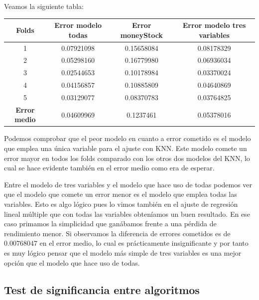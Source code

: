 \documentclass[12pt,a4paper]{article}
\begin{document}
Veamos la siguiente tabla:

\begin{table}[H]
	\centering
	\begin{tabular}{|c|c|c|c|}
		\hline
		\textbf{Folds}       & \textbf{Error modelo todas} & \textbf{Error moneyStock} & \textbf{Error modelo tres variables} \\ \hline
		1                    & 0.07921098                  & 0.15658084                & 0.08178329                           \\ \hline
		2                    & 0.05298160                  & 0.16779980                & 0.06936034                           \\ \hline
		3                    & 0.02544653                  & 0.10178984                & 0.03370024                           \\ \hline
		4                    & 0.04156857                  & 0.10885809                & 0.04640869                           \\ \hline
		5                    & 0.03129077                  & 0.08370783                & 0.03764825                           \\ \hline
		\textbf{Error medio} & 0.04609969                  & 0.1237461                 & 0.05378016                           \\ \hline
	\end{tabular}
\end{table}

Podemos comprobar que el peor modelo en cuanto a error cometido es el modelo que emplea una única variable para el ajuste con KNN. Este modelo comete un error mayor en todos los folds comparado con los otros dos modelos del KNN, lo cual se hace evidente también en el error medio como era de esperar.

Entre el modelo de tres variables y el modelo que hace uso de todas podemos ver que el modelo que comete un error menor es el modelo que emplea todas las variables. Esto es algo lógico pues lo vimos también en el ajuste de regresión lineal múltiple que con todas las variables obteníamos un buen resultado. En ese caso primamos la simplicidad que ganábamos frente a una pérdida de rendimiento menor. Si observamos la diferencia de errores cometidos es de $0.00768047$ en el error medio, lo cual es prácticamente insignificante y por tanto es muy lógico pensar que el modelo más simple de tres variables es una mejor opción que el modelo que hace uso de todas.

\subsection{Test de significancia entre algoritmos}
\end{document}
